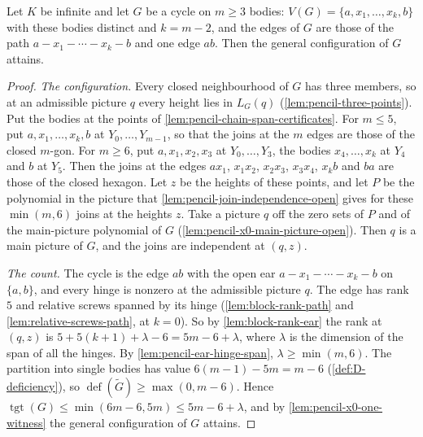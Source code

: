\begin{theorem}[A cycle]
  \label{thm:pencil-x0-cycle}
  \leanok
  Let $K$ be infinite and let $G$ be a cycle on $m \ge 3$ bodies:
  $V(G) = \{a, x_1, \dots, x_k, b\}$ with these bodies distinct and
  $k = m - 2$, and the edges of $G$ are those of the path
  $a - x_1 - \cdots - x_k - b$ and one edge $ab$. Then the general
  configuration of $G$ attains.
\end{theorem}
\begin{proof}
  \leanok
  \emph{The configuration.} Every closed neighbourhood of $G$ has three
  members, so at an admissible picture $q$ every height lies in $L_G(q)$
  (\cref{lem:pencil-three-points}). Put the bodies at the points of
  \cref{lem:pencil-chain-span-certificates}. For $m \le 5$, put
  $a, x_1, \dots, x_k, b$ at $Y_0, \dots, Y_{m-1}$, so that the joins at
  the $m$ edges are those of the closed $m$-gon. For $m \ge 6$, put
  $a, x_1, x_2, x_3$ at $Y_0, \dots, Y_3$, the bodies $x_4, \dots, x_k$
  at $Y_4$ and $b$ at $Y_5$. Then the joins at the edges $a x_1$,
  $x_1 x_2$, $x_2 x_3$, $x_3 x_4$, $x_k b$ and $ba$ are those of the
  closed hexagon. Let $z$ be the heights of these points, and let $P$ be
  the polynomial in the picture that
  \cref{lem:pencil-join-independence-open} gives for these $\min(m, 6)$
  joins at the heights $z$. Take a picture $q$ off the zero sets of $P$
  and of the main-picture polynomial of $G$
  (\cref{lem:pencil-x0-main-picture-open}). Then $q$ is a main picture of
  $G$, and the joins are independent at $(q, z)$.

  \emph{The count.} The cycle is the edge $ab$ with the open ear
  $a - x_1 - \cdots - x_k - b$ on $\{a, b\}$, and every hinge is nonzero
  at the admissible picture $q$. The edge has rank $5$ and relative
  screws spanned by its hinge (\cref{lem:block-rank-path} and
  \cref{lem:relative-screws-path}, at $k = 0$). So by
  \cref{lem:block-rank-ear} the rank at $(q, z)$ is
  $5 + 5(k + 1) + \lambda - 6 = 5m - 6 + \lambda$, where $\lambda$ is the
  dimension of the span of all the hinges. By
  \cref{lem:pencil-ear-hinge-span}, $\lambda \ge \min(m, 6)$. The
  partition into single bodies has value $6(m - 1) - 5m = m - 6$
  (\cref{def:D-deficiency}), so
  $\operatorname{def}(\tilde G) \ge \max(0, m - 6)$. Hence
  $\operatorname{tgt}(G) \le \min(6m - 6, 5m) \le 5m - 6 + \lambda$, and
  by \cref{lem:pencil-x0-one-witness} the general configuration of $G$
  attains.
\end{proof}

